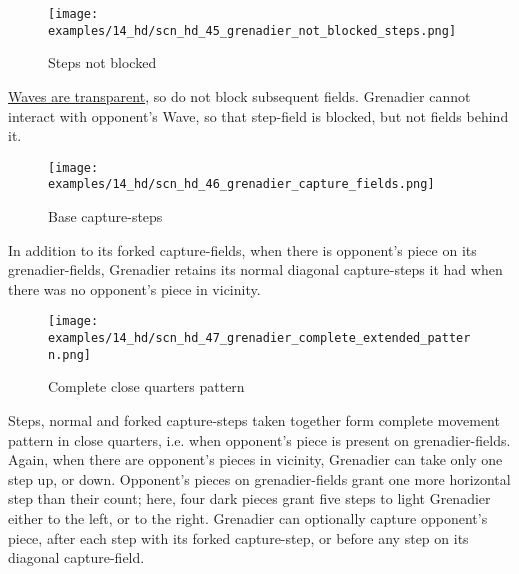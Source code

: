 \vspace*{3.3\baselineskip}
\noindent
\begin{wrapfigure}[5]{l}{0.41\textwidth}
\centering
\texttt{[image: examples/14\_hd/scn\_hd\_45\_grenadier\_not\_blocked\_steps.png]}
\vspace*{-0.5\baselineskip}
\caption{Steps not blocked}
\label{fig:scn_hd_45_grenadier_not_blocked_steps}
\end{wrapfigure}
\hyperref[fig:scn_mv_07_wave_is_transparent]{Waves are transparent}, so do not block
subsequent fields. Grenadier cannot interact with opponent's Wave, so that step-field
is blocked, but not fields behind it.

\clearpage %

\vspace*{-2.3\baselineskip}
\noindent
\begin{wrapfigure}[7]{l}{0.4\textwidth}
\centering
\texttt{[image: examples/14\_hd/scn\_hd\_46\_grenadier\_capture\_fields.png]}
\vspace*{-0.5\baselineskip}
\caption{Base capture-steps}
\label{fig:scn_hd_46_grenadier_capture_fields}
\end{wrapfigure}
In addition to its forked capture-fields, when there is opponent's piece on its
grenadier-fields, Grenadier retains its normal diagonal capture-steps it had when
there was no opponent's piece in vicinity.

\vspace*{0.3\baselineskip}
\noindent
\begin{figure}[!h]
\texttt{[image: examples/14\_hd/scn\_hd\_47\_grenadier\_complete\_extended\_pattern.png]}
\vspace*{-1.3\baselineskip}
\caption{Complete close quarters pattern}
\label{fig:scn_hd_47_grenadier_complete_extended_pattern}
\end{figure}

\vspace*{-0.5\baselineskip}
Steps, normal and forked capture-steps taken together form complete movement pattern
in close quarters, i.e. when opponent's piece is present on grenadier-fields. \newline
\indent
Again, when there are opponent's pieces in vicinity, Grenadier can take only one step
up, or down. Opponent's pieces on grenadier-fields grant one more horizontal step than
their count; here, four dark pieces grant five steps to light Grenadier either to the
left, or to the right. \newline
\indent
Grenadier can optionally capture opponent's piece, after each step with its forked
capture-step, or before any step on its diagonal capture-field.

